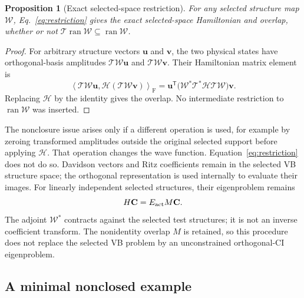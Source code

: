 \documentclass[11pt,a4paper]{article}
\newtheorem{proposition}{Proposition}
\DeclareMathOperator{\ran}{ran}
\newcommand{\Tr}{^{\mathsf T}}
\newcommand{\ip}[2]{\left\langle #1,#2\right\rangle_{\mathrm F}}
\newcommand{\Wa}{\mathcal W}
\newcommand{\Ta}{\mathcal T}
\newcommand{\Ha}{\mathcal H}
\renewcommand{\vv}[1]{\mathbf{#1}}
\begin{document}
\begin{proposition}[Exact selected-space restriction]\label{prop:closure}
For any selected structure map $\Wa$, Eq.~\eqref{eq:restriction} gives
the exact selected-space Hamiltonian and overlap, whether or not
$\Ta\ran\Wa\subseteq\ran\Wa$.
\end{proposition}
\begin{proof}
For arbitrary structure vectors $\vv u$ and $\vv v$, the two physical
states have orthogonal-basis amplitudes $\Ta\Wa\vv u$ and
$\Ta\Wa\vv v$. Their Hamiltonian matrix element is
\begin{equation}
 \ip{\Ta\Wa\vv u}{\Ha(\Ta\Wa\vv v)}
 =\vv u\Tr\bigl(\Wa^*\Ta^*\Ha\Ta\Wa\bigr)\vv v.
\end{equation}
Replacing $\Ha$ by the identity gives the overlap. No intermediate
restriction to $\ran\Wa$ was inserted.
\end{proof}

The nonclosure issue arises only if a different operation is used, for
example by zeroing transformed amplitudes outside the original selected
support before applying $\Ha$. That operation changes the wave function.
Equation~\eqref{eq:restriction} does not do so. Davidson vectors and Ritz
coefficients remain in the selected VB structure space; the orthogonal
representation is used internally to evaluate their images.
For linearly independent selected structures, their eigenproblem remains
\begin{equation}
 H\vv C=E_{\rm act}M\vv C.
\end{equation}
The adjoint $\Wa^*$ contracts against the selected test structures; it is
not an inverse coefficient transform. The nonidentity overlap $M$ is
retained, so this procedure does not replace the selected VB problem by
an unconstrained orthogonal-CI eigenproblem.

\subsection{A minimal nonclosed example}
\end{document}
